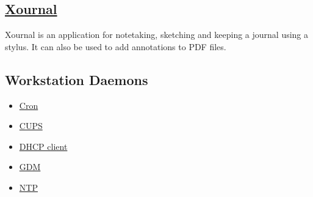 \subsection{\href{http://xournal.sourceforge.net/}{Xournal}}

 Xournal is an application for notetaking, sketching and
 keeping a journal using a stylus. It can also be used to
 add annotations to PDF files.

\subsection{Workstation Daemons}
\begin{itemize}
\item \href{http://ftp.isc.org/isc/cron/}{Cron}
\item \href{http://www.cups.org/}{CUPS}
\item \href{http://www.isc.org/}{DHCP client}
\item \href{https://wiki.gnome.org/Projects/GDM}{GDM}
\item \href{http://support.ntp.org/}{NTP}
\end{itemize}

